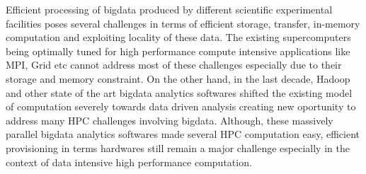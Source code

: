 
Efficient processing of bigdata produced by different scientific experimental facilities poses several challenges in terms of efficient storage, transfer, in-memory computation and exploiting locality of these data. 
The existing supercomputers being optimally tuned for high performance compute intensive applications like MPI, Grid etc cannot address most of these challenges especially due to their storage and memory constraint.
On the other hand, in the last decade, Hadoop and other state of the art bigdata analytics softwares shifted the existing model of computation severely towards data driven analysis creating new oportunity to address many HPC challenges involving bigdata.
Although, these massively parallel bigdata analytics softwares made several HPC computation easy, efficient provisioning in terms hardwares still remain a major challenge especially in the context of data intensive high performance computation.

